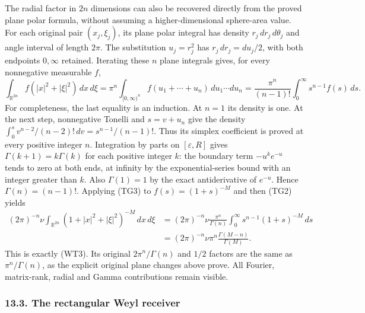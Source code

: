\documentclass[
  11pt,
]{article}
\begin{document}
The radial factor in \(2n\) dimensions can also be recovered directly
from the proved plane polar formula, without assuming a
higher-dimensional sphere-area value. For each original pair
\((x_j,\xi_j)\), its plane polar integral has density
\(r_j\,dr_j\,d\theta_j\) and angle interval of length \(2\pi\). The
substitution \(u_j=r_j^2\) has \(r_j\,dr_j=du_j/2\), with both endpoints
\(0,\infty\) retained. Iterating these \(n\) plane integrals gives, for
every nonnegative measurable \(f\), \[
 \int_{\mathbb R^{2n}}f(|x|^2+|\xi|^2)\,dx\,d\xi
       =\pi^n\int_{[0,\infty)^n}f(u_1+\cdots+u_n)
                                        \,du_1\cdots du_n
       =\frac{\pi^n}{(n-1)!}\int_0^\infty s^{n-1}f(s)\,ds.
                                                               \tag{TG3}
\] For completeness, the last equality is an induction. At \(n=1\) its
density is one. At the next step, nonnegative Tonelli and \(s=v+u_n\)
give the density \(\int_0^s v^{n-2}/(n-2)!\,dv=s^{n-1}/(n-1)!\). Thus
its simplex coefficient is proved at every positive integer \(n\).
Integration by parts on \([\varepsilon,R]\) gives
\(\Gamma(k+1)=k\Gamma(k)\) for each positive integer \(k\): the boundary
term \(-u^ke^{-u}\) tends to zero at both ends, at infinity by the
exponential-series bound with an integer greater than \(k\). Also
\(\Gamma(1)=1\) by the exact antiderivative of \(e^{-u}\). Hence
\(\Gamma(n)=(n-1)!\). Applying (TG3) to \(f(s)=(1+s)^{-M}\) and then
(TG2) yields \[
 \begin{aligned}
 (2\pi)^{-n}\nu\int_{\mathbb R^{2n}}
                        (1+|x|^2+|\xi|^2)^{-M}\,dx\,d\xi
 &=(2\pi)^{-n}\nu\frac{\pi^n}{\Gamma(n)}
                     \int_0^\infty s^{n-1}(1+s)^{-M}\,ds\\
 &=(2\pi)^{-n}\nu\pi^n
                          \frac{\Gamma(M-n)}{\Gamma(M)}.
 \end{aligned}                                                  \tag{TG4}
\] This is exactly (WT3). Its original \(2\pi^n/\Gamma(n)\) and \(1/2\)
factors are the same as \(\pi^n/\Gamma(n)\), as the explicit original
plane changes above prove. All Fourier, matrix-rank, radial and Gamma
contributions remain visible.

\subsubsection{13.3. The rectangular Weyl
receiver}\label{the-rectangular-weyl-receiver}
\end{document}
